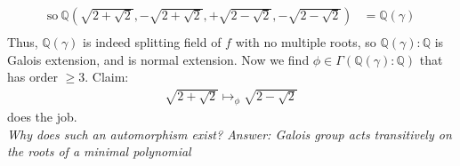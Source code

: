 \documentclass{article}
\begin{document}
\begin{homeworkProblem}
\begin{align}
        \text{so} \ \mathbb{Q} \left(\sqrt{2+\sqrt{2}}, -\sqrt{2+\sqrt{2}}, +\sqrt{2-\sqrt{2}}, - \sqrt{2-\sqrt{2}}\right) &= \mathbb{Q}(\gamma)\\
    \end{align}
    Thus, $\mathbb{Q}(\gamma)$ is indeed splitting field of $f$ with no multiple roots,
    so $\mathbb{Q}(\gamma): \mathbb{Q}$ is Galois extension, 
    and is normal extension. 
    Now we find $\phi \in \Gamma(\mathbb{Q}(\gamma):\mathbb{Q})$ that has order $\geq 3$. Claim:
    \begin{align}
        \sqrt{2 + \sqrt{2}} \mapsto_{\phi} \sqrt{2 - \sqrt{2}}  
    \end{align}
    does the job.\\
    \textit{Why does such an automorphism exist?
    Answer: Galois group acts transitively on the roots of a minimal polynomial}




\end{homeworkProblem}
\end{document}
